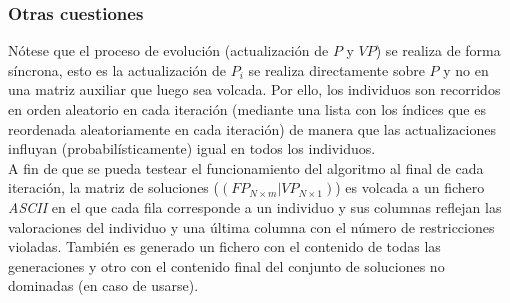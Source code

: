 \subsubsection{Otras cuestiones}

Nótese que el proceso de evolución (actualización de $P$ y $VP$) se realiza de forma síncrona, esto es la actualización de $P_{i}$ se realiza directamente sobre $P$ y no en una matriz auxiliar que luego sea volcada. Por ello, los individuos son recorridos en orden aleatorio en cada iteración (mediante una lista con los índices que es reordenada aleatoriamente en cada iteración) de manera que las actualizaciones influyan (probabilísticamente) igual en todos los individuos.\\

A fin de que se pueda testear el funcionamiento del algoritmo al final de cada iteración, la matriz de soluciones ($(FP_{N \times m} |VP_{N \times 1})$) es volcada a un fichero \textit{ASCII} en el que cada fila corresponde a un individuo y sus columnas reflejan las valoraciones del individuo y una última columna con el número de restricciones violadas. También es generado un fichero con el contenido de todas las generaciones y otro con el contenido final del conjunto de soluciones no dominadas (en caso de usarse).\\




